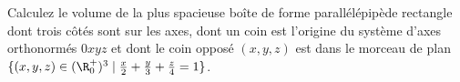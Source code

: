 
\begin{exercice}\label{exoOptimSS0005}

Calculez le volume de la plus spacieuse boîte  de forme parallélépipède rectangle dont trois côtés sont sur les axes, dont un coin est l'origine du système d'axes orthonormés $0xyz$ et dont le coin opposé $(x,y,z)$ est dans le morceau de plan $\{ (x,y,z) \in (\R^+_0)^3 \mid \frac{x}2 + \frac{y}3 + \frac{z}4 = 1 \}$.


\end{exercice}
